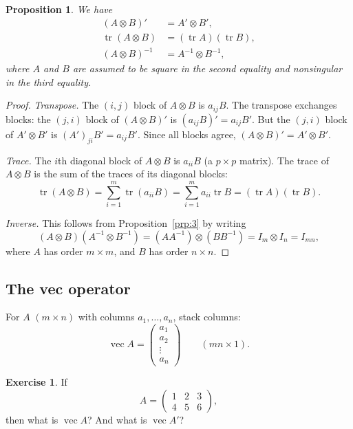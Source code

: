 \documentclass[14pt]{extarticle}
\theoremstyle{plain}
\newtheorem{proposition}{Proposition}
\theoremstyle{definition}
\newtheorem{exercise}{Exercise}
\theoremstyle{remark}
\DeclareMathOperator{\tr}{tr}
\DeclareMathOperator{\avec}{vec}
\begin{document}
\begin{proposition}\label{prp:4}
We have
\begin{align*}
(A \otimes B)' &= A' \otimes B', \\
\tr(A \otimes B) &= (\tr A)(\tr B), \\
(A \otimes B)^{-1} &= A^{-1} \otimes B^{-1},
\end{align*}
where $A$ and $B$ are assumed to be square in the second equality and nonsingular in the third equality.
\end{proposition}

\begin{proof}
\emph{Transpose.} The $(i,j)$ block of $A \otimes B$ is $a_{ij}B$. The transpose exchanges blocks: the $(j,i)$ block of $(A \otimes B)'$ is $(a_{ij}B)' = a_{ij}B'$. But the $(j,i)$ block of $A' \otimes B'$ is $(A')_{ji} B' = a_{ij} B'$. Since all blocks agree, $(A \otimes B)' = A' \otimes B'$.

\emph{Trace.} The $i$th diagonal block of $A \otimes B$ is $a_{ii}B$ (a $p \times p$ matrix). The trace of $A \otimes B$ is the sum of the traces of its diagonal blocks:
\[
\tr(A \otimes B) = \sum_{i=1}^m \tr(a_{ii}B) = \sum_{i=1}^m a_{ii} \tr B = (\tr A)(\tr B).
\]

\emph{Inverse.} This follows from Proposition~\ref{prp:3} by writing
\[
(A \otimes B)(A^{-1} \otimes B^{-1}) = (AA^{-1}) \otimes (BB^{-1}) = I_m \otimes I_n = I_{mn},
\]
where $A$ has order $m \times m$, and $B$ has order $n \times n$.
\end{proof}

\subsection{The vec operator}\label{sec:2.4}

For $A$ $(m\times n)$ with columns $a_1, \dots, a_n$, stack columns:
\begin{equation}\label{eq:3}
\avec A = \begin{pmatrix} a_1 \\ a_2 \\ \vdots \\ a_n \end{pmatrix} \qquad (mn \times 1).
\end{equation}

\begin{exercise}\label{exer:2}
If
\[
A = \begin{pmatrix} 1 & 2 & 3 \\ 4 & 5 & 6 \end{pmatrix},
\]
then what is $\avec A$? And what is $\avec A'$?
\end{exercise}
\end{document}
